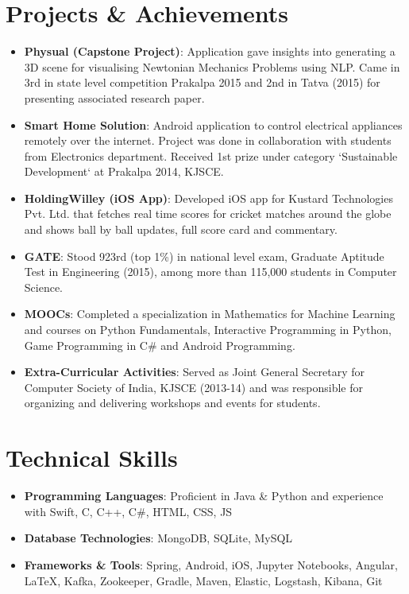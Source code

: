 \documentclass[letterpaper,11pt]{article}
\newcommand{\resumeItem}[2]{
	\item\normalsize{
		\textbf{#1}{: #2}
	}
}
\newcommand{\resumeSubItem}[2]{\resumeItem{#1}{#2}\vspace{-4pt}}
\newcommand{\resumeSubHeadingListStart}{\begin{itemize}[leftmargin=*]}
\newcommand{\resumeSubHeadingListEnd}{\end{itemize}}
\begin{document}
	
	
	
	\section{Projects \& Achievements}
	\resumeSubHeadingListStart
	\resumeSubItem{Physual (Capstone Project)}
	{Application gave insights into generating a 3D scene for visualising Newtonian Mechanics Problems using NLP. Came in 3rd in state level competition Prakalpa 2015 and 2nd in Tatva (2015) for presenting associated research paper.}
	\resumeSubItem{Smart Home Solution}
	{Android application to control electrical appliances remotely over the internet. Project was done in collaboration with students from Electronics department. Received 1st prize under category ‘Sustainable Development‘ at Prakalpa 2014, KJSCE.}
	\resumeSubItem{HoldingWilley (iOS App)}
	{Developed iOS app for Kustard Technologies Pvt. Ltd. that fetches real time scores for cricket matches around the globe and shows ball by ball updates, full score card and  commentary.}
	\resumeSubItem{GATE}
	{Stood 923rd (top 1\%) in national level exam, Graduate Aptitude Test in Engineering (2015), among more than 115,000 students in Computer Science.}
	\resumeSubItem{MOOCs}
	{Completed a specialization in Mathematics for Machine Learning and courses on Python Fundamentals, Interactive Programming in Python, Game Programming in C\# and Android Programming.}
	\resumeSubItem{Extra-Curricular Activities}
	{Served as Joint General Secretary for Computer Society of India, KJSCE (2013-14) and was responsible for organizing and delivering workshops and events for students.}
	\resumeSubHeadingListEnd
	
	
	\section{Technical Skills}
	\resumeSubHeadingListStart
	\item{
		\textbf{Programming Languages}{: Proficient in Java \& Python and experience with Swift, C, C++, C\#, HTML, CSS, JS}}
	\vspace{-8pt}
	\item{
		\textbf{Database Technologies}{: MongoDB, SQLite, MySQL}}
	\vspace{-8pt}
	\item{
		\textbf{Frameworks \& Tools}{: Spring, Android, iOS, Jupyter Notebooks, Angular, \LaTeX, Kafka, Zookeeper, Gradle, Maven, Elastic, Logstash, Kibana, Git}}
	\resumeSubHeadingListEnd
	
	
\end{document}
